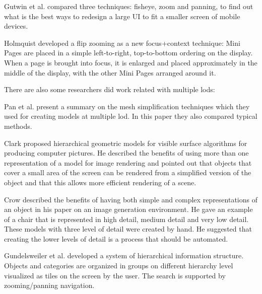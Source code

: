 Gutwin et al. \cite{gutwin2004interacting} compared three techniques: fisheye, zoom and panning, to find out what is the best ways to redesign a large UI to fit a smaller screen of mobile devices.

Holmquist \cite{holmquist1998zoom} developed a flip zooming as a new focus+context technique: Mini Pages are placed in a simple left-to-right, top-to-bottom ordering on the display. When a page is brought into focus, it is enlarged and placed approximately in the middle of the display, with the other Mini Pages arranged around it.

There are also some researchers did work related with multiple \glspl{lod}:

Pan et al. \cite{zhigeng1998overview} present a summary on the mesh simplification techniques which they used for creating models at multiple \gls{lod}. In this paper they also compared typical methods.

Clark \cite{clark1976hierarchical} proposed hierarchical geometric models for visible surface algorithms for producing computer pictures. He described the benefits of using more than one representation of a model for image rendering and pointed out that objects that cover a small area of the screen can be rendered from a simplified version of the object and that this allows more efficient rendering of a scene.

Crow described the benefits of having both simple and complex representations of an object in his paper on an image generation environment.\cite{crow1982more} He gave an example of a chair that is represented in high detail, medium detail and very low detail. These models with three level of detail were created by hand. He suggested that creating the lower levels of detail is a process that should be automated.

Gundelsweiler et al. \cite{gundelsweiler2007zeus} developed a system of hierarchical information structure. Objects and categories are organized in groups on different hierarchy level visualized as tiles on the screen by the user. The search is supported by zooming/panning navigation.







